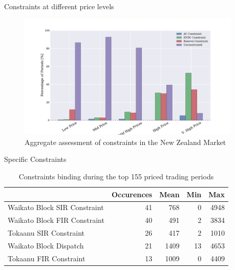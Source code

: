 \documentclass[xcolor=x11names,compress]{beamer}
\renewcommand{\(}{\begin{columns}}
\renewcommand{\)}{\end{columns}}
\newcommand{\<}[1]{\begin{column}{#1}}
\renewcommand{\>}{\end{column}}
\begin{document}
\begin{frame}{Constraints at different price levels}
\begin{figure}
\includegraphics[width=0.95\textwidth]{img/constrained_periods_analysis.pdf}
\caption{Aggregate assessment of constraints in the New Zealand Market}
\end{figure}
\end{frame}

\begin{frame}{Specific Constraints}
\begin{table}
\caption{Constraints binding during the top 155 priced trading periods}
\begin{tabular}{lrrrr}
\toprule
{} &  Occurences &  Mean &  Min &  Max \\
\midrule
Waikato Block SIR Constraint &          41 &   768 &    0 & 4948 \\
Waikato Block FIR Constraint &          40 &   491 &    2 & 3834 \\
Tokaanu SIR Constraint       &          26 &   417 &    2 & 1010 \\
Waikato Block Dispatch       &          21 &  1409 &   13 & 4653 \\
Tokaanu FIR Constraint       &          13 &  1009 &    0 & 4409 \\
\bottomrule
\end{tabular}
\end{table}
\end{frame}
\end{document}
